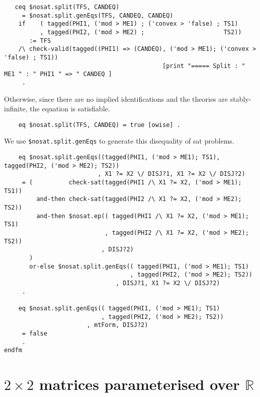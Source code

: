 \documentclass[]{article}
\begin{document}
\begin{verbatim}
   ceq $nosat.split(TFS, CANDEQ)
     = $nosat.split.genEqs(TFS, CANDEQ, CANDEQ)
    if    ( tagged(PHI1, ('mod > ME1) ; ('convex > 'false) ; TS1)
          , tagged(PHI2, ('mod > ME2) ;                      TS2))
       := TFS
    /\ check-valid(tagged((PHI1) => (CANDEQ), ('mod > ME1); ('convex > 'false) ; TS1))
                                            [print "===== Split : "  ME1 " : " PHI1 " => " CANDEQ ]
     .
\end{verbatim}

Otherwise, since there are no implied identifications and the theories
are stably-infinite, the equation is satisfiable.

\begin{verbatim}
    eq $nosat.split(TFS, CANDEQ) = true [owise] .
\end{verbatim}

We use \texttt{\$nosat.split.genEqs} to generate this disequality of sat
problems.

\begin{verbatim}
    eq $nosat.split.genEqs((tagged(PHI1, ('mod > ME1); TS1), tagged(PHI2, ('mod > ME2); TS2))
                          , X1 ?= X2 \/ DISJ?1, X1 ?= X2 \/ DISJ?2)
     = (          check-sat(tagged(PHI1 /\ X1 ?= X2, ('mod > ME1); TS1))
         and-then check-sat(tagged(PHI2 /\ X1 ?= X2, ('mod > ME2); TS2))
         and-then $nosat.ep(( tagged(PHI1 /\ X1 ?= X2, ('mod > ME1); TS1)
                            , tagged(PHI2 /\ X1 ?= X2, ('mod > ME2); TS2))
                           , DISJ?2)
       )
       or-else $nosat.split.genEqs(( tagged(PHI1, ('mod > ME1); TS1)
                                   , tagged(PHI2, ('mod > ME2); TS2))
                               , DISJ?1, X1 ?= X2 \/ DISJ?2)
     .

    eq $nosat.split.genEqs(( tagged(PHI1, ('mod > ME1); TS1)
                           , tagged(PHI2, ('mod > ME2); TS2))
                       , mtForm, DISJ?2)
     = false
     .
endfm
\end{verbatim}

\newcommand \R {\mathbb{R}}

\hypertarget{times-2-matrices-parameterised-over-mathbbr}{%
\section{\texorpdfstring{\(2 \times 2\) matrices parameterised over
\(\mathbb{R}\)}{2 \textbackslash{}times 2 matrices parameterised over \textbackslash{}mathbb\{R\}}}\label{times-2-matrices-parameterised-over-mathbbr}}
\end{document}
